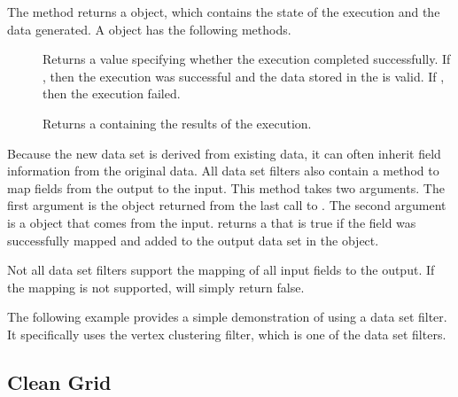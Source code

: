 The  method returns a  object,
which contains the state of the execution and the data generated. A
 object has the following methods.

\begin{description}
\item[] Returns a  value specifying
  whether the execution completed successfully. If , then
  the execution was successful and the data stored in the
   is valid. If , then the
  execution failed.
\item[] Returns a  containing
  the results of the execution.
\end{description}

Because the new data set is derived from existing data, it can often
inherit field information from the original data. All data set filters also
contain a  method to map fields from the
output to the input. This method takes two arguments. The first argument is
the  object returned from the last call to
. The second argument is a  object that
comes from the input.  returns a
 that is true if the field was successfully mapped and added
to the output data set in the  object.

\begin{commonerrors}
  Not all data set filters support the mapping of all input fields to the
  output. If the mapping is not supported, 
  will simply return false.
\end{commonerrors}

The following example provides a simple demonstration of using a data set
filter. It specifically uses the vertex clustering filter, which is one of
the data set filters.


\subsection{Clean Grid}


